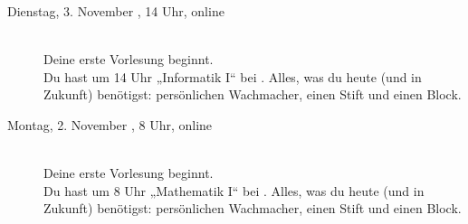 \begin{description}
\ifbachelor
    \iflehramt
        \item[Dienstag, 3. November \YEAR, 14 Uhr, online]\ \\
            Deine erste Vorlesung beginnt. \\
            Du hast um 14 Uhr „Informatik I“ bei \Infoprof.
            Alles, was du heute (und in Zukunft) benötigst: persönlichen Wachmacher, einen Stift und einen Block. %

    \else
        \item[Montag, 2. November \YEAR, 8 Uhr, online]\ \\
            Deine erste Vorlesung beginnt. \\
            Du hast um 8 Uhr „Mathematik I“ bei \Matheprof.
            Alles, was du heute (und in Zukunft) benötigst: persönlichen Wachmacher, einen Stift und einen Block. %

    \fi
\fi





\end{description}
